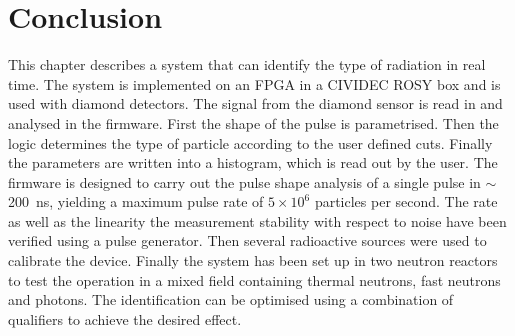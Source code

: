 \section{Conclusion}
\label{sec:conclcurrent}
This chapter describes a system that can identify the type of radiation in real time. The system is implemented on an FPGA in a CIVIDEC ROSY box and is used with diamond detectors. The signal from the diamond sensor is read in and analysed in the firmware. First the shape of the pulse is parametrised. Then the logic determines the type of particle according to the user defined cuts. Finally the parameters are written into a histogram, which is read out by the user. The firmware is designed to carry out the pulse shape analysis of a single pulse in $\sim$200~ns, yielding a maximum pulse rate of $5\times10^6$ particles per second. The rate as well as the linearity the measurement stability with respect to noise have been verified using a pulse generator. Then several radioactive sources were used to calibrate the device. Finally the system has been set up in two neutron reactors to test the operation in a mixed field containing thermal neutrons, fast neutrons and photons. The identification can be optimised using a combination of qualifiers to achieve the desired effect.


